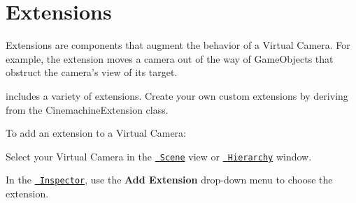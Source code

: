 \chapter{Extensions}
\hypertarget{md__hey_tea_9_2_library_2_package_cache_2com_8unity_8cinemachine_0d2_89_87_2_documentation_0i_2_414e015286be387e4fe85aa25dd01df7}{}\label{md__hey_tea_9_2_library_2_package_cache_2com_8unity_8cinemachine_0d2_89_87_2_documentation_0i_2_414e015286be387e4fe85aa25dd01df7}
\label{md__hey_tea_9_2_library_2_package_cache_2com_8unity_8cinemachine_0d2_89_87_2_documentation_0i_2_414e015286be387e4fe85aa25dd01df7_autotoc_md737}%
%
 Extensions are components that augment the behavior of a Virtual Camera. For example, the  extension moves a camera out of the way of Game\+Objects that obstruct the camera’s view of its target.

 includes a variety of extensions. Create your own custom extensions by deriving from the {\ttfamily Cinemachine\+Extension} class.

To add an extension to a Virtual Camera\+:


\begin{DoxyEnumerate}
\item Select your Virtual Camera in the \href{https://docs.unity3d.com/Manual/UsingTheSceneView.html}{\texttt{ Scene}} view or \href{https://docs.unity3d.com/Manual/Hierarchy.html}{\texttt{ Hierarchy}} window.
\item In the \href{https://docs.unity3d.com/Manual/UsingTheInspector.html}{\texttt{ Inspector}}, use the {\bfseries{Add Extension}} drop-\/down menu to choose the extension. 
\end{DoxyEnumerate}